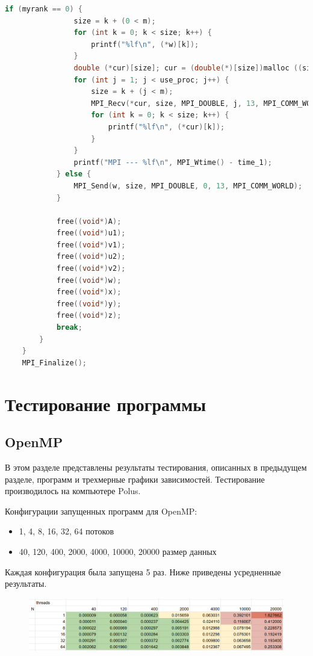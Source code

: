 \documentclass{article}
\begin{document}
\begin{lstlisting}[language = C]
            if (myrank == 0) {
                size = k + (0 < m);
                for (int k = 0; k < size; k++) {
                    printf("%lf\n", (*w)[k]);
                }
                double (*cur)[size]; cur = (double(*)[size])malloc ((size) * sizeof(double));
                for (int j = 1; j < use_proc; j++) {
                    size = k + (j < m);
                    MPI_Recv(*cur, size, MPI_DOUBLE, j, 13, MPI_COMM_WORLD, &status[0]);
                    for (int k = 0; k < size; k++) {
                        printf("%lf\n", (*cur)[k]);
                    }
                }
                printf("MPI --- %lf\n", MPI_Wtime() - time_1);
            } else {
                MPI_Send(w, size, MPI_DOUBLE, 0, 13, MPI_COMM_WORLD);
            }

            free((void*)A);
            free((void*)u1);
            free((void*)v1);
            free((void*)u2);
            free((void*)v2);
            free((void*)w);
            free((void*)x);
            free((void*)y);
            free((void*)z);
            break;
        }
    }
    MPI_Finalize();
\end{lstlisting}

\section{Тестирование программы}
\subsection{OpenMP}
В этом разделе представлены результаты тестирования, описанных в
предыдущем разделе, программ и трехмерные графики зависимостей. Тестирование
производилось на компьютере Polus.

\vspace{0.5cm}
Конфигурации запущенных программ для OpenMP:
\begin{itemize}
    \item 1, 4, 8, 16, 32, 64 потоков
    \item 40, 120, 400, 2000, 4000, 10000, 20000 размер данных
\end{itemize}

Каждая конфигурация была запущена 5 раз. Ниже приведены усредненные результаты.

\begin{figure}[H]
    \centering
    \includegraphics[scale = 0.3]{omp_res.png}
\end{figure}
\end{document}
